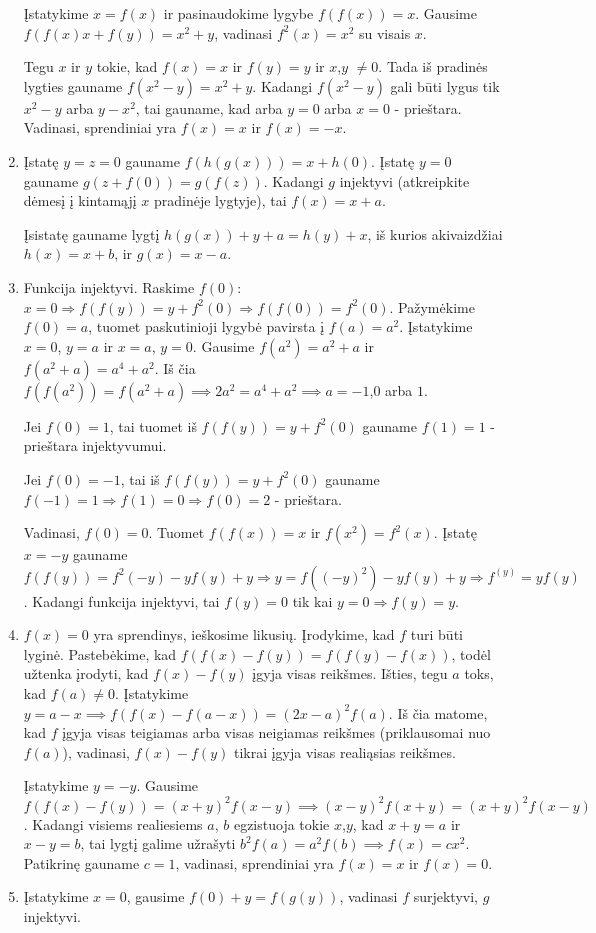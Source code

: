 \begin{enumerate}
    Įstatykime $x = f(x)$ ir pasinaudokime lygybe $f(f(x))=x$. Gausime
    $f(f(x)x + f(y))=x^2 + y$, vadinasi $f^2(x)=x^2$ su visais $x$.
    
    Tegu $x$ ir $y$ tokie, kad $f(x)=x$ ir $f(y)=y$ ir $x$,$y$ $\neq 0$.
    Tada iš pradinės lygties gauname $f(x^2 - y) = x^2 + y$. Kadangi
    $f(x^2 - y)$ gali būti lygus tik $x^2 -y$ arba $y-x^2$, tai gauname,
    kad arba $y=0$ arba $x=0$ - prieštara. Vadinasi, sprendiniai yra
    $f(x)=x$ ir $f(x)=-x$.
\item
    Įstatę $y=z=0$ gauname $f(h(g(x)))=x+h(0)$. Įstatę $y=0$ gauname
    $g(z+f(0))=g(f(z))$. Kadangi $g$ injektyvi (atkreipkite dėmesį į
    kintamąjį $x$ pradinėje lygtyje), tai $f(x)=x+a$.
    
    Įsistatę gauname lygtį $h(g(x)) + y + a = h(y) + x$, iš kurios
    akivaizdžiai $h(x)=x+b$, ir $g(x)=x-a$.
\item
    Funkcija injektyvi. Raskime $f(0)$: $x=0 \Rightarrow f(f(y))=y +
    f^2(0) \Rightarrow f(f(0))=f^2(0)$. Pažymėkime $f(0)=a$, tuomet
    paskutinioji lygybė pavirsta į $f(a)=a^2$. Įstatykime $x=0$, $y=a$ ir
    $x=a$, $y=0$. Gausime $f(a^2)=a^2+a$ ir $f(a^2+a)=a^4+a^2$. Iš čia
    $f(f(a^2))=f(a^2+a)\implies 2a^2 = a^4 + a^2 \implies a=-1$,$0$
    arba $1$.
    
    Jei $f(0)=1$, tai tuomet iš $f(f(y))=y + f^2(0)$ gauname $f(1)=1$ -
    prieštara injektyvumui.
    
    Jei $f(0)=-1$, tai iš $f(f(y))=y + f^2(0)$ gauname $f(-1)=1
    \Rightarrow f(1)=0 \Rightarrow f(0)=2$ - prieštara.
    
    Vadinasi, $f(0)=0$. Tuomet $f(f(x))=x$ ir $f(x^2)=f^2(x)$. Įstatę
    $x=-y$ gauname $f(f(y))=f^2(-y) -yf(y) + y \Rightarrow y = f((-y)^2) -
    yf(y) + y\Rightarrow f^(y)=yf(y)$. Kadangi funkcija injektyvi, tai
    $f(y)=0$ tik kai $y=0 \Rightarrow f(y)=y$.
\item
    $f(x)=0$ yra sprendinys, ieškosime likusių. Įrodykime, kad $f$ turi
    būti lyginė. Pastebėkime, kad $f(f(x)-f(y))=f(f(y)-f(x))$, todėl
    užtenka įrodyti, kad $f(x)-f(y)$ įgyja visas reikšmes. Išties, tegu
    $a$ toks, kad $f(a)\neq 0$. Įstatykime $y= a-x \implies
    f(f(x)-f(a-x))=(2x-a)^2f(a)$. Iš čia matome, kad $f$ įgyja visas
    teigiamas arba visas neigiamas reikšmes (priklausomai nuo $f(a)$),
    vadinasi, $f(x)-f(y)$ tikrai įgyja visas realiąsias reikšmes.
    
    Įstatykime $y=-y$. Gausime $f(f(x)-f(y))=(x+y)^2f(x-y) \implies
    (x-y)^2f(x+y)=(x+y)^2f(x-y)$. Kadangi visiems realiesiems $a$, $b$
    egzistuoja tokie $x$,$y$, kad $x+y=a$ ir $x-y=b$, tai lygtį galime
    užrašyti $b^2f(a)=a^2f(b) \implies f(x)=cx^2$. Patikrinę gauname
    $c=1$, vadinasi, sprendiniai yra $f(x)=x$ ir $f(x)=0$.
\item
    Įstatykime $x = 0$, gausime $f(0)+y=f(g(y))$, vadinasi $f$ surjektyvi,
    $g$ injektyvi.
    

\end{enumerate}
